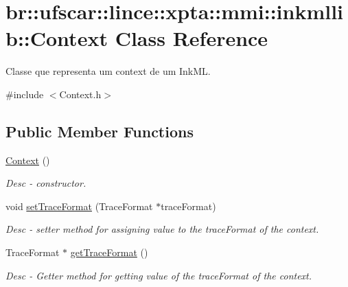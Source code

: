 \hypertarget{classbr_1_1ufscar_1_1lince_1_1xpta_1_1mmi_1_1inkmllib_1_1Context}{
\section{br::ufscar::lince::xpta::mmi::inkmllib::Context Class Reference}
\label{classbr_1_1ufscar_1_1lince_1_1xpta_1_1mmi_1_1inkmllib_1_1Context}
}


Classe que representa um context de um InkML.  




{\ttfamily \#include $<$Context.h$>$}

\subsection*{Public Member Functions}
\begin{DoxyCompactItemize}
\item 
\hyperlink{classbr_1_1ufscar_1_1lince_1_1xpta_1_1mmi_1_1inkmllib_1_1Context_a1f3a86710a6cfc23792b3963c88b94a6}{Context} ()
\begin{DoxyCompactList}\small\item\em Desc -\/ constructor. \item\end{DoxyCompactList}\item 
void \hyperlink{classbr_1_1ufscar_1_1lince_1_1xpta_1_1mmi_1_1inkmllib_1_1Context_a573823c9b3f1220a937251f753a9d318}{setTraceFormat} (TraceFormat $\ast$traceFormat)
\begin{DoxyCompactList}\small\item\em Desc -\/ setter method for assigning value to the traceFormat of the context. \item\end{DoxyCompactList}\item 
TraceFormat $\ast$ \hyperlink{classbr_1_1ufscar_1_1lince_1_1xpta_1_1mmi_1_1inkmllib_1_1Context_acf1377bad3c4f3eec7b6c090c5b44232}{getTraceFormat} ()
\begin{DoxyCompactList}\small\item\em Desc -\/ Getter method for getting value of the traceFormat of the context. \item\end{DoxyCompactList}\end{DoxyCompactItemize}
